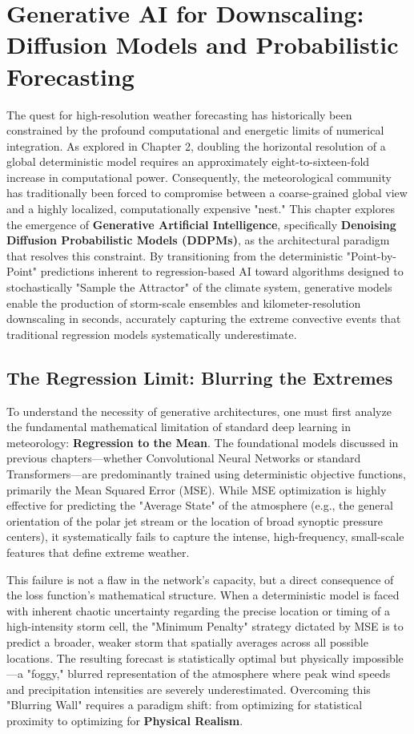 \chapter{Generative AI for Downscaling: Diffusion Models and Probabilistic Forecasting}

The quest for high-resolution weather forecasting has historically been constrained by the profound computational and energetic limits of numerical integration. As explored in Chapter 2, doubling the horizontal resolution of a global deterministic model requires an approximately eight-to-sixteen-fold increase in computational power. Consequently, the meteorological community has traditionally been forced to compromise between a coarse-grained global view and a highly localized, computationally expensive "nest." This chapter explores the emergence of \textbf{Generative Artificial Intelligence}, specifically \textbf{Denoising Diffusion Probabilistic Models (DDPMs)}, as the architectural paradigm that resolves this constraint. By transitioning from the deterministic "Point-by-Point" predictions inherent to regression-based AI toward algorithms designed to stochastically "Sample the Attractor" of the climate system, generative models enable the production of storm-scale ensembles and kilometer-resolution downscaling in seconds, accurately capturing the extreme convective events that traditional regression models systematically underestimate.

\section{The Regression Limit: Blurring the Extremes}

To understand the necessity of generative architectures, one must first analyze the fundamental mathematical limitation of standard deep learning in meteorology: \textbf{Regression to the Mean}. The foundational models discussed in previous chapters—whether Convolutional Neural Networks or standard Transformers—are predominantly trained using deterministic objective functions, primarily the Mean Squared Error (MSE). While MSE optimization is highly effective for predicting the "Average State" of the atmosphere (e.g., the general orientation of the polar jet stream or the location of broad synoptic pressure centers), it systematically fails to capture the intense, high-frequency, small-scale features that define extreme weather. 

This failure is not a flaw in the network's capacity, but a direct consequence of the loss function's mathematical structure. When a deterministic model is faced with inherent chaotic uncertainty regarding the precise location or timing of a high-intensity storm cell, the "Minimum Penalty" strategy dictated by MSE is to predict a broader, weaker storm that spatially averages across all possible locations. The resulting forecast is statistically optimal but physically impossible—a "foggy," blurred representation of the atmosphere where peak wind speeds and precipitation intensities are severely underestimated. Overcoming this "Blurring Wall" requires a paradigm shift: from optimizing for statistical proximity to optimizing for \textbf{Physical Realism}.

